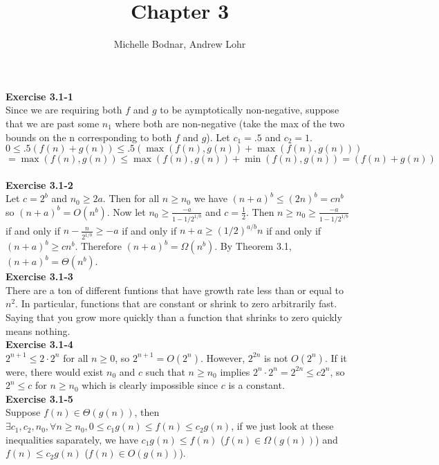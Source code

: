 \documentclass{article}
\title{Chapter 3}
\author{Michelle Bodnar, Andrew Lohr}
\begin{document}
\maketitle

\noindent\textbf{Exercise 3.1-1}\\

Since we are requiring both $f$ and $g$ to be aymptotically non-negative, suppose that we are past some $n_1$ where both are non-negative (take the max of the two bounds on the n corresponding to both $f$ and $g$). Let $c_1=.5$ and $c_2=1$.
\[
0\le .5(f(n)+g(n)) \le .5(\max(f(n),g(n)) + \max(f(n),g(n))) \]\[= \max(f(n),g(n)) \le \max(f(n),g(n))+\min(f(n),g(n)) = (f(n)+g(n))
\]\\

\noindent\textbf{Exercise 3.1-2}\\

Let $c = 2^b$ and $n_0 \geq 2a$.  Then for all $n \geq n_0$ we have $(n+a)^b \leq (2n)^b = cn^b$ so $(n+a)^b = O(n^b)$.  Now let $n_0 \geq \frac{-a}{1-1/2^{1/b}}$ and $c = \frac{1}{2}$.  Then $n \geq n_0 \geq \frac{-a}{1-1/2^{1/b}}$ if and only if $n - \frac{n}{2^{1/b}} \geq -a$ if and only if $n+a \geq (1/2)^{a/b}n$ if and only if $(n+a)^b \geq cn^b$.  Therefore $(n+a)^b = \Omega(n^b)$.  By Theorem 3.1, $(n+a)^b = \Theta(n^b)$.\\

\noindent\textbf{Exercise 3.1-3}\\

There are a ton of different funtions that have growth rate less than or equal to $n^2$. In particular, functions that are constant or shrink to zero arbitrarily fast. Saying that you grow more quickly than a function that shrinks to zero quickly means nothing. \\

\noindent\textbf{Exercise 3.1-4}\\

$2^{n+1} \leq 2\cdot 2^n$ for all $n \geq 0$, so $2^{n+1} = O(2^n)$.  However, $2^{2n}$ is not $O(2^n)$.  If it were, there would exist $n_0$ and $c$ such that $n \geq n_0$ implies $2^n \cdot 2^n = 2^{2n} \leq c2^n$, so $2^n \leq c$ for $n \geq n_0$ which is clearly impossible since $c$ is a constant.  \\


\noindent\textbf{Exercise 3.1-5}\\

Suppose $f(n)\in \Theta(g(n))$, then $\exists c_1,c_2,n_0, \forall n\ge n_0, 0\le c_1 g(n) \le f(n) \le c_2 g(n)$, if we just look at these inequalities saparately, we have $c_1 g(n) \le f(n)$ ($f(n) \in \Omega(g(n))$) and $f(n) \le c_2 g(n)$ ($f(n)\in O(g(n))$).
\end{document}
